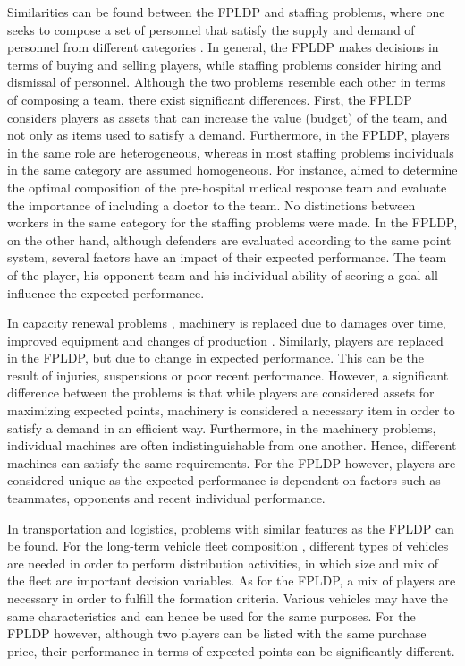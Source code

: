 \newpar

Similarities can be found between the FPLDP and staffing problems, where one seeks to compose a set of personnel that satisfy the supply and demand of personnel from different categories \citep{Komarudin,Bruecker}. In general, the FPLDP makes decisions in terms of buying and selling players, while staffing problems consider hiring and dismissal of personnel. Although the two problems resemble each other in terms of composing a team, there exist significant differences. First, the FPLDP considers players as assets that can increase the value (budget) of the team, and not only as items used to satisfy a demand. Furthermore, in the FPLDP, players in the same role are heterogeneous, whereas in most staffing problems individuals in the same category are assumed homogeneous. For instance, \cite{Davis} aimed to determine the optimal composition of the pre-hospital medical response team and evaluate the importance of including a doctor to the team. No distinctions between workers in the same category for the staffing problems were made. In the FPLDP, on the other hand, although defenders are evaluated according to the same point system, several factors have an impact of their expected performance. The team of the player, his opponent team and his individual ability of scoring a goal all influence the expected performance.

\newpar

In capacity renewal problems \citep{Chand,Rajagopalan}, machinery is replaced due to damages over time, improved equipment and changes of production \citep{Hopp,Adkins}. Similarly, players are replaced in the FPLDP, but due to change in expected performance. This can be the result of injuries, suspensions or poor recent performance. However, a significant difference between the problems is that while players are considered assets for maximizing expected points, machinery is considered a necessary item in order to satisfy a demand in an efficient way. Furthermore, in the machinery problems, individual machines are often indistinguishable from one another. Hence, different machines can satisfy the same requirements. For the FPLDP however, players are considered unique as the expected performance is dependent on factors such as teammates, opponents and recent individual performance.

\newpar

In transportation and logistics, problems with similar features as the FPLDP can be found. For the long-term vehicle fleet composition \citep{Jabali}, different types of vehicles are needed in order to perform distribution activities, in which size and mix of the fleet are important decision variables. As for the FPLDP, a mix of players are necessary in order to fulfill the formation criteria. Various vehicles may have the same characteristics and can hence be used for the same purposes. For the FPLDP however, although two players can be listed with the same purchase price, their performance in terms of expected points can be significantly different.


